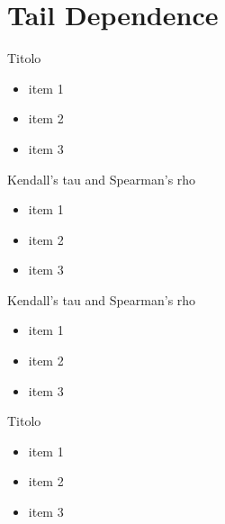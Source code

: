 \documentclass[11pt]{beamer}
\theoremstyle{plain}
\theoremstyle{definition}
\theoremstyle{remark}
\begin{document}
\section{Tail Dependence}
%
\begin{frame}{Titolo}
   \begin{itemize}
      \item   				  						  
		item 1 
	  \item item 2
\item item 3
   \end{itemize}
\end{frame}


%
\begin{frame}{Kendall's tau and Spearman's rho}
   \begin{itemize}
      \item   				  						  
		item 1 
	  \item item 2
\item item 3
   \end{itemize}
\end{frame}

%
\begin{frame}{Kendall's tau and Spearman's rho}
   \begin{itemize}
      \item   				  						  
		item 1 
	  \item item 2
\item item 3
   \end{itemize}
\end{frame}

%
\begin{frame}{Titolo}
   \begin{itemize}
      \item   				  						  
		item 1 
	  \item item 2
\item item 3
   \end{itemize}
\end{frame}



%

\end{document}
